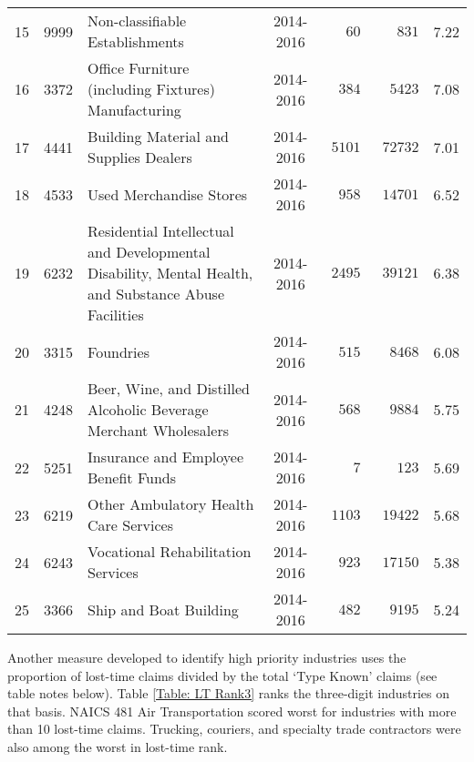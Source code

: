\documentclass[9pt, oneside]{article}   	%
\begin{document}
\begin{longtable}{ccp{2.5in}cccc}
15  & 9999 & Non-classifiable Establishments & 2014-2016 & $\phantom{000}60$ & $\phantom{000}831$ &  7.22 \\
16  & 3372 & Office Furniture (including Fixtures) Manufacturing & 2014-2016 & $\phantom{00}384$ & $\phantom{00}5423$ &  7.08 \\
17  & 4441 & Building Material and Supplies Dealers & 2014-2016 & $\phantom{0}5101$ & $\phantom{0}72732$ &  7.01 \\
18  & 4533 & Used Merchandise Stores & 2014-2016 & $\phantom{00}958$ & $\phantom{0}14701$ &  6.52 \\
19  & 6232 & Residential Intellectual and Developmental Disability, Mental Health, and Substance Abuse Facilities & 2014-2016 & $\phantom{0}2495$ & $\phantom{0}39121$ &  6.38 \\
20  & 3315 & Foundries & 2014-2016 & $\phantom{00}515$ & $\phantom{00}8468$ &  6.08 \\
21  & 4248 & Beer, Wine, and Distilled Alcoholic Beverage Merchant Wholesalers & 2014-2016 & $\phantom{00}568$ & $\phantom{00}9884$ &  5.75 \\
22  & 5251 & Insurance and Employee Benefit Funds & 2014-2016 & $\phantom{0000}7$ & $\phantom{000}123$ &  5.69 \\
23 & 6219 & Other Ambulatory Health Care Services & 2014-2016 & $\phantom{0}1103$ & $\phantom{0}19422$ &  5.68 \\
24  & 6243 & Vocational Rehabilitation Services & 2014-2016 & $\phantom{00}923$ & $\phantom{0}17150$ &  5.38 \\
25  & 3366 & Ship and Boat Building & 2014-2016 & $\phantom{00}482$ & $\phantom{00}9195$ &  5.24 \\
\hline 
\cline{1-1} \cline{2-2} \cline{3-3} \cline{4-4} \cline{5-5}  \cline{6-6} \cline{7-7} %
\hline 
\end{longtable}

\pagebreak

Another measure developed to identify high priority industries uses the proportion of lost-time claims divided by the total  `Type Known' claims (see table notes below). Table \ref{Table: LT Rank3} ranks the three-digit industries on that basis. NAICS 481 Air Transportation scored worst for industries with more than 10 lost-time claims. Trucking, couriers, and specialty trade contractors were also among the worst in lost-time rank.
\end{document}
